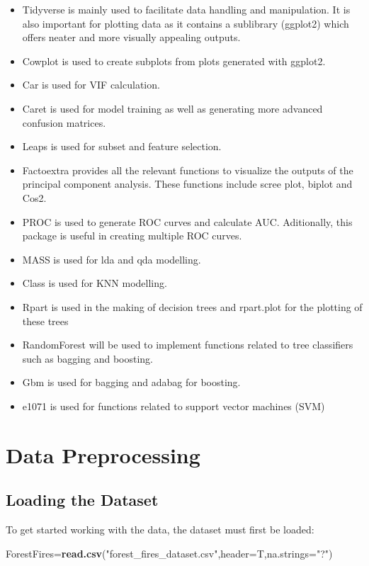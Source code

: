 \documentclass[
]{article}
\newenvironment{Shaded}{\begin{snugshade}}{\end{snugshade}}
\newcommand{\AttributeTok}[1]{\textcolor[rgb]{0.13,0.29,0.53}{#1}}
\newcommand{\FunctionTok}[1]{\textcolor[rgb]{0.13,0.29,0.53}{\textbf{#1}}}
\newcommand{\NormalTok}[1]{#1}
\newcommand{\OtherTok}[1]{\textcolor[rgb]{0.56,0.35,0.01}{#1}}
\newcommand{\StringTok}[1]{\textcolor[rgb]{0.31,0.60,0.02}{#1}}
\begin{document}
\begin{itemize}
\item
  Tidyverse is mainly used to facilitate data handling and manipulation.
  It is also important for plotting data as it contains a sublibrary
  (ggplot2) which offers neater and more visually appealing outputs.
\item
  Cowplot is used to create subplots from plots generated with ggplot2.
\item
  Car is used for VIF calculation.
\item
  Caret is used for model training as well as generating more advanced
  confusion matrices.
\item
  Leaps is used for subset and feature selection.
\item
  Factoextra provides all the relevant functions to visualize the
  outputs of the principal component analysis. These functions include
  scree plot, biplot and Cos2.
\item
  PROC is used to generate ROC curves and calculate AUC. Aditionally,
  this package is useful in creating multiple ROC curves.
\item
  MASS is used for lda and qda modelling.
\item
  Class is used for KNN modelling.
\item
  Rpart is used in the making of decision trees and rpart.plot for the
  plotting of these trees
\item
  RandomForest will be used to implement functions related to tree
  classifiers such as bagging and boosting.
\item
  Gbm is used for bagging and adabag for boosting.
\item
  e1071 is used for functions related to support vector machines (SVM)
\end{itemize}

\section{Data Preprocessing}\label{data-preprocessing}

\subsection{Loading the Dataset}\label{loading-the-dataset}

To get started working with the data, the dataset must first be loaded:

\begin{Shaded}
\begin{Highlighting}[]
\NormalTok{ForestFires}\OtherTok{=}\FunctionTok{read.csv}\NormalTok{(}\StringTok{"forest\_fires\_dataset.csv"}\NormalTok{,}\AttributeTok{header=}\NormalTok{T,}\AttributeTok{na.strings=}\StringTok{"?"}\NormalTok{)}
\end{Highlighting}
\end{Shaded}
\end{document}
